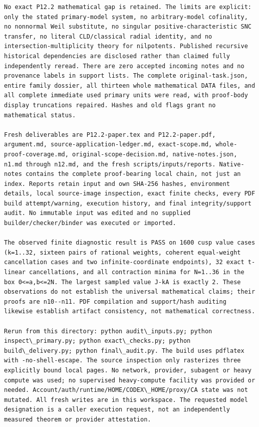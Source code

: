 \documentclass[11pt]{article}
\begin{document}
\begin{Verbatim}[fontsize=\tiny,breaklines=true,breakanywhere=true]
No exact P12.2 mathematical gap is retained. The limits are explicit: only the stated primary-model system, no arbitrary-model cofinality, no nonnormal Weil substitute, no singular positive-characteristic SNC transfer, no literal CLD/classical radial identity, and no intersection-multiplicity theory for nilpotents. Published recursive historical dependencies are disclosed rather than claimed fully independently reread. There are zero accepted incoming notes and no provenance labels in support lists. The complete original-task.json, entire family dossier, all thirteen whole mathematical DATA files, and all complete immediate used primary units were read, with proof-body display truncations repaired. Hashes and old flags grant no mathematical status.

Fresh deliverables are P12.2-paper.tex and P12.2-paper.pdf, argument.md, source-application-ledger.md, exact-scope.md, whole-proof-coverage.md, original-scope-decision.md, native-notes.json, n1.md through n12.md, and the fresh scripts/inputs/reports. Native-notes contains the complete proof-bearing local chain, not just an index. Reports retain input and own SHA-256 hashes, environment details, local source-image inspection, exact finite checks, every PDF build attempt/warning, execution history, and final integrity/support audit. No immutable input was edited and no supplied builder/checker/binder was executed or imported.

The observed finite diagnostic result is PASS on 1600 cusp value cases (k=1..32, sixteen pairs of rational weights, coherent equal-weight cancellation cases and two infinite-coordinate endpoints), 32 exact t-linear cancellations, and all contraction minima for N=1..36 in the box 0<=a,b<=2N. The largest sampled value J-kA is exactly 2. These observations do not establish the universal mathematical claims; their proofs are n10--n11. PDF compilation and support/hash auditing likewise establish artifact consistency, not mathematical correctness.

Rerun from this directory: python audit\_inputs.py; python inspect\_primary.py; python exact\_checks.py; python build\_delivery.py; python final\_audit.py. The build uses pdflatex with -no-shell-escape. The source inspection only rasterizes three explicitly bound local pages. No network, provider, subagent or heavy compute was used; no supervised heavy-compute facility was provided or needed. Account/auth/runtime/HOME/CODEX\_HOME/proxy/CA state was not mutated. All fresh writes are in this workspace. The requested model designation is a caller execution request, not an independently measured theorem or provider attestation.


\end{Verbatim}
\end{document}
